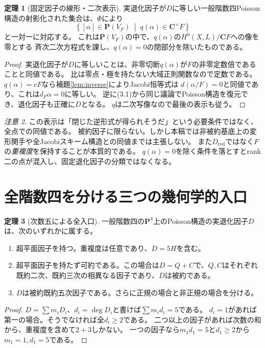\documentclass[a4paper,11pt]{ltjsarticle}
\theoremstyle{definition}
\newtheorem{theorem}{定理}[section]
\theoremstyle{definition}\newtheorem{definition}[theorem]{定義}
\theoremstyle{remark}\newtheorem{remark}[theorem]{注意}
\newcommand{\PP}{\mathbf P}\newcommand{\CC}{\mathbf C}
\begin{document}
\begin{theorem}[固定因子の線形・二次表示]\label{thm:fibre}
実退化因子が$D$に等しい一般階数四Poisson構造の射影化された集合は、$\Phi$により
\[
 \left\{[\alpha]\in\PP(V_F)\;\middle|\;
       q(\alpha)\in\CC^{\times}F\right\}                 \tag{3.1}
\]
と一対一に対応する。
これは$\PP(V_F)$の中で、$q(\alpha)$の$H^0(X,L)/\CC F$への像を零とする
斉次二次方程式を課し、$q(\alpha)=0$の閉部分を除いたものである。
\end{theorem}
\begin{proof}
実退化因子が$D$に等しいことは、非零切断$q(\alpha)$が$F$の非零定数倍であることと同値である。
比は零点・極を持たない大域正則関数なので定数である。
$q(\alpha)=cF$なら補題\ref{lem:inverse}によりJacobi恒等式は
$d(\alpha/F)=0$と同値であり、これは$d_F\alpha=0$に等しい。
逆に(3.1)から同じ議論でPoisson構造を復元でき、退化因子も正確に$D$となる。
$q$は二次写像なので最後の表示も従う。
\end{proof}

\begin{remark}
この表示は「閉じた逆形式が得られそうだ」という必要条件ではなく、全点での同値である。
被約因子に限らない。しかし本稿では非被約基底上の変形関手や全Jacobiスキーム構造との同値までは主張しない。
また$D_{\mathrm{red}}$ではなく$F$の\emph{重複度}を保持することが本質的である。
$q(\alpha)=0$を除く条件を落とすとrank二の点が混入し、固定退化因子の分類ではなくなる。
\end{remark}

\section{全階数四を分ける三つの幾何学的入口}\label{sec:global-entry}
\begin{theorem}[次数五による全入口]\label{thm:three-entrances}
一般階数四の$\PP^4$上のPoisson構造の実退化因子$D$は、次のいずれかに属する。
\begin{enumerate}
\item 超平面因子を持つ。重複度は任意であり、$D=5H$を含む。
\item 超平面因子を持たず可約である。この場合は$D=Q+C$で、$Q,C$はそれぞれ既約二次、既約三次の相異なる因子であり、$D$は被約である。
\item $D$は被約既約五次因子である。さらに正規の場合と非正規の場合を分ける。
\end{enumerate}
\end{theorem}
\begin{proof}
$D=\sum m_iD_i$、$d_i=\deg D_i$と書けば$\sum m_id_i=5$である。
$d_i=1$があれば第一の場合。そうでなければ全$d_i\ge2$である。
二つ以上の因子があれば次数の和から、重複度を含めて$2+3$しかない。
一つの因子なら$m_1d_1=5$と$d_1\ge2$から$m_1=1,d_1=5$である。
\end{proof}
\end{document}
